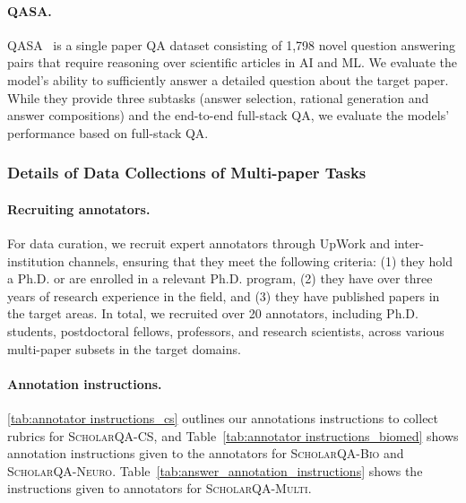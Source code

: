 \paragraph{QASA.}
\textsc{QASA}~\citep{lee2023qasa} is a single paper QA dataset consisting of 1,798
novel question answering pairs that require reasoning over scientific articles in AI and ML. We evaluate the model's ability to sufficiently answer a detailed question about the target paper. While they provide three subtasks (answer selection, rational generation and answer compositions) and the end-to-end full-stack QA, we evaluate the models' performance based on full-stack QA. 


\subsubsection{Details of Data Collections of Multi-paper Tasks }

\paragraph{Recruiting annotators.} 
For data curation, we recruit expert annotators through UpWork and inter-institution channels, ensuring that they meet the following criteria: (1) they hold a Ph.D. or are enrolled in a relevant Ph.D. program, (2) they have over three years of research experience in the field, and (3) they have published papers in the target areas. In total, we recruited over 20 annotators, including Ph.D. students, postdoctoral fellows, professors, and research scientists, across various multi-paper subsets in the target domains. 

\paragraph{Annotation instructions.} 
{\autoref{tab:annotator instructions_cs} outlines our annotations instructions to collect rubrics for \textsc{ScholarQA-CS}}, and 
Table~\ref{tab:annotator instructions_biomed} shows annotation instructions given to the annotators for \textsc{ScholarQA-Bio} and \textsc{ScholarQA-Neuro}.
Table~\ref{tab:answer_annotation_instructions} shows the instructions given to annotators for \textsc{ScholarQA-Multi}. 


